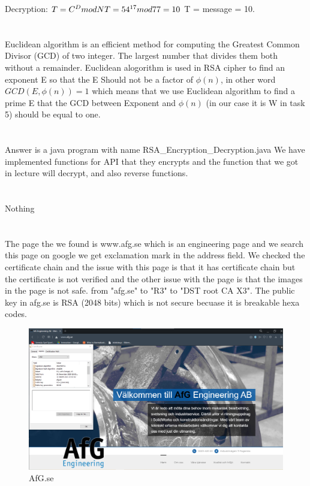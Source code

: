 \documentclass{article}
\begin{document}
            Decryption:\newline
        \begin{math}
            T = C ^ D mod N \newline 
            T = 54^{17} mod 77 = 10
        \end{math}\newline
        T = message = 10. 
    \section{}
    Euclidean algorithm is an efficient method for computing the Greatest Common Divisor (GCD) of two integer. The largest number that divides them both without a remainder.\newline
    Euclidean alogorithm is used in RSA cipher to find an exponent E so that the E Should not be a factor of $\phi(n)$, in other word $GCD(E,\phi(n)) = 1$ 
    which means that we use Euclidean algorithm to find a prime E that the GCD between Exponent and $\phi(n)$ (in our case it is W in task 5) should be equal to one.
    \section{}
    Answer is a java program with name RSA\_Encryption\_Decryption.java\newline
    We have implemented functions for API that they encrypts and the function that we got in lecture will decrypt, and also reverse functions.
    \section{}
    Nothing
    \section{}
    The page the we found is www.afg.se which is an engineering page and we search this page on google we
    get exclamation mark in the address field. We checked the certificate chain and the issue with this page is that it has certificate chain but the certificate is not verified and the other issue with the page is that the images in the page is not safe. from "afg.se" to "R3" to "DST root CA X3". 
    The public key in afg.se is RSA (2048 bits) which is not secure becuase it is breakable hexa codes.\cite{AFG}
    \begin{figure}
        \includegraphics[width=\linewidth]{afg.png}
        \caption{AfG.se}
        \label{fig:AfG}
    \end{figure}
\end{document}
